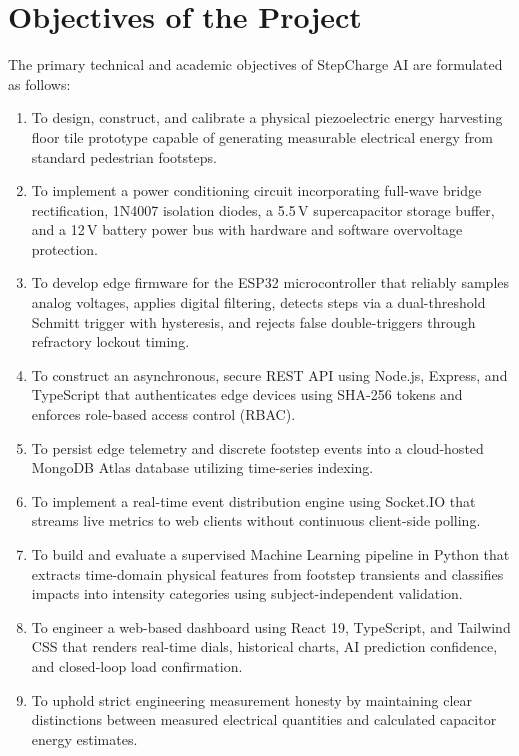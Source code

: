 \section{Objectives of the Project}
The primary technical and academic objectives of StepCharge AI are formulated as follows:
\begin{enumerate}
    \item To design, construct, and calibrate a physical piezoelectric energy harvesting floor tile prototype capable of generating measurable electrical energy from standard pedestrian footsteps.
    \item To implement a power conditioning circuit incorporating full-wave bridge rectification, 1N4007 isolation diodes, a 5.5\,V supercapacitor storage buffer, and a 12\,V battery power bus with hardware and software overvoltage protection.
    \item To develop edge firmware for the ESP32 microcontroller that reliably samples analog voltages, applies digital filtering, detects steps via a dual-threshold Schmitt trigger with hysteresis, and rejects false double-triggers through refractory lockout timing.
    \item To construct an asynchronous, secure REST API using Node.js, Express, and TypeScript that authenticates edge devices using SHA-256 tokens and enforces role-based access control (RBAC).
    \item To persist edge telemetry and discrete footstep events into a cloud-hosted MongoDB Atlas database utilizing time-series indexing.
    \item To implement a real-time event distribution engine using Socket.IO that streams live metrics to web clients without continuous client-side polling.
    \item To build and evaluate a supervised Machine Learning pipeline in Python that extracts time-domain physical features from footstep transients and classifies impacts into intensity categories using subject-independent validation.
    \item To engineer a web-based dashboard using React 19, TypeScript, and Tailwind CSS that renders real-time dials, historical charts, AI prediction confidence, and closed-loop load confirmation.
    \item To uphold strict engineering measurement honesty by maintaining clear distinctions between measured electrical quantities and calculated capacitor energy estimates.
\end{enumerate}

